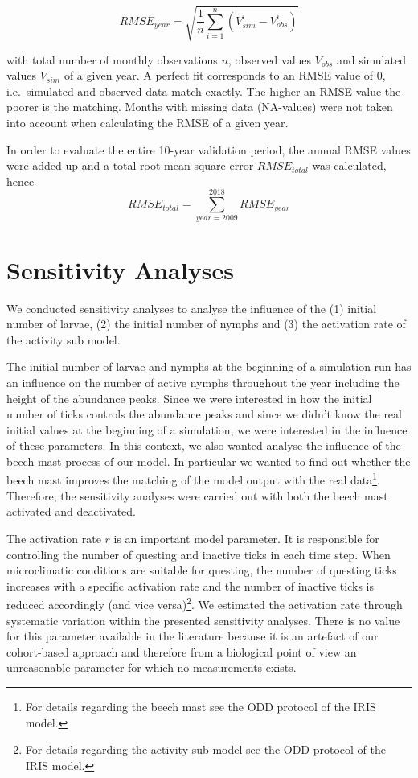 \documentclass[a4paper, 11pt]{scrartcl}
\begin{document}
\begin{equation}\label{eq:rmse}
RMSE_{year} = \sqrt{ \frac{1}{n} \sum_{i=1}^n (V_{sim}^i - V_{obs}^i)}
\end{equation}

with total number of monthly observations $n$, observed values $V_{obs}$ and simulated values $V_{sim}$ of a given year. A perfect fit corresponds to an RMSE value of 0, i.e.\
simulated and observed data match exactly. The higher an RMSE value the poorer is the matching. Months with missing data (NA-values) were not taken into account when
calculating the RMSE of a given year.

In order to evaluate the entire 10-year validation period, the annual RMSE values were added up and a total root mean square error $RMSE_{total}$ was calculated, hence
\begin{equation}\label{eq:total_rmse}
RMSE_{total} = \sum_{year=2009}^{2018} RMSE_{year}
\end{equation}


\section{Sensitivity Analyses}
We conducted sensitivity analyses to analyse the influence of the (1) initial number of larvae, (2) the initial number of nymphs and (3) the activation rate of the activity sub
model.

The initial number of larvae and nymphs at the beginning of a simulation run has an influence on the number of active nymphs throughout the year including the height of the
abundance peaks. Since we were interested in how the initial number of ticks controls the abundance peaks and since we didn't know the real initial values at the beginning of a
simulation, we were interested in the influence of these parameters. In this context, we also wanted analyse the influence of the beech mast process of our model. In
particular we wanted to find out whether the beech mast improves the matching of the model output with the real data\footnote{For details regarding the beech mast
see the ODD protocol of the IRIS model.}. Therefore, the sensitivity analyses were carried out with both the beech mast activated and deactivated.

The activation rate $r$ is an important model parameter. It is responsible for controlling the number of questing and inactive ticks in each time step. When microclimatic
conditions are suitable for questing, the number of questing ticks increases with a specific activation rate and the number of inactive ticks is reduced accordingly (and vice
versa)\footnote{For details regarding the activity sub model see the ODD protocol of the IRIS model.}. We estimated the activation rate through systematic variation within the
presented sensitivity analyses. There is no value for this parameter available in the literature because it is an artefact of our cohort-based approach and
therefore from a biological point of view an unreasonable parameter for which no measurements exists.
\end{document}
